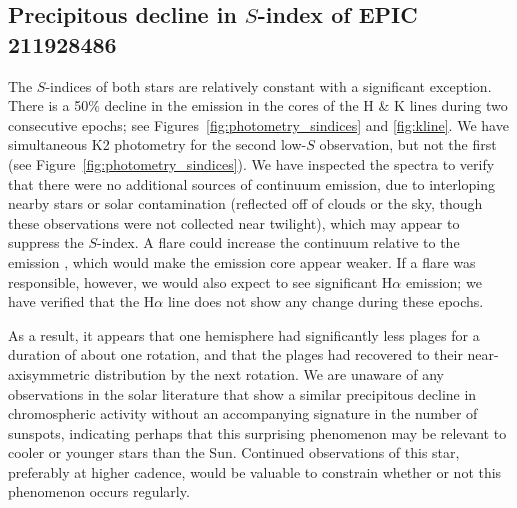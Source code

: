 \subsection{Precipitous decline in $S$-index of EPIC 211928486}

The $S$-indices of both stars are relatively constant with a significant exception. There is a 50\% decline in the emission in the cores of the  H \& K lines during two consecutive epochs; %
see Figures~\ref{fig:photometry_sindices} and \ref{fig:kline}. We have simultaneous K2 photometry for the second low-$S$ observation, but not the first (see Figure~\ref{fig:photometry_sindices}). We have inspected the spectra to verify that there were no additional sources of continuum emission, due to interloping nearby stars or solar contamination (reflected off of clouds or the sky, though these observations were not collected near twilight), which may appear to suppress the $S$-index. A flare could increase the continuum relative to the  emission \citep{Kowalski2013}, which would make the emission core appear weaker.
If a flare was responsible, however, we would also expect to see significant H$\alpha$ emission; we have verified that the H$\alpha$ line does not show any change during these epochs. 

As a result, it appears that one hemisphere had significantly less plages for a duration of about one rotation, and that the plages had recovered to their near-axisymmetric distribution by the next rotation. We are unaware of any observations in the solar literature that show a similar precipitous decline in chromospheric activity without an accompanying signature in the number of sunspots, indicating perhaps that this surprising phenomenon may be relevant to cooler or younger stars than the Sun. Continued observations of this star, preferably at higher cadence, would be valuable to constrain whether or not this phenomenon occurs regularly.

